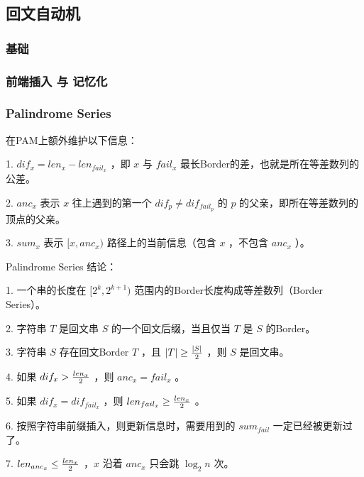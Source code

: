 

\subsection{回文自动机}

\subsubsection{基础}



\vspace{-0.2cm}

\subsubsection{前端插入 与 记忆化}



\subsubsection{Palindrome Series}

在PAM上额外维护以下信息：

1. $dif_x=len_x-len_{fail_x}$ ，即 $x$ 与 $fail_x$ 最长Border的差，也就是所在等差数列的公差。

2. $anc_x$ 表示 $x$ 往上遇到的第一个 $dif_p\not=dif_{fail_p}$ 的 $p$ 的父亲，即所在等差数列的顶点的父亲。

3. $sum_x$ 表示 $[x,anc_x)$ 路径上的当前信息（包含 $x$ ，不包含 $anc_x$ ）。

Palindrome Series 结论：

1. 一个串的长度在 $[2^k,2^{k+1})$ 范围内的Border长度构成等差数列（Border Series）。

2. 字符串 $T$ 是回文串 $S$ 的一个回文后缀，当且仅当 $T$ 是 $S$ 的Border。

3. 字符串 $S$ 存在回文Border $T$ ，且 $|T|\ge{|S|\over 2}$ ，则 $S$ 是回文串。

4. 如果 $dif_x>{len_x\over 2}$ ，则 $anc_x=fail_x$ 。

5. 如果 $dif_x=dif_{fail_x}$ ，则 $len_{fail_x}\ge{len_x\over 2}$ 。

6. 按照字符串前缀插入，则更新信息时，需要用到的 $sum_{fail}$ 一定已经被更新过了。

7. $len_{anc_x}\le{len_x\over 2}$ ，$x$ 沿着 $anc_x$ 只会跳 $\log_2n$ 次。

